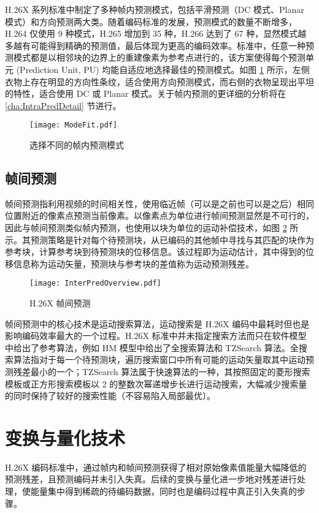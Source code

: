 H.26X 系列标准中制定了多种帧内预测模式，包括平滑预测（DC 模式、Planar 模式）和方向预测两大类。随着编码标准的发展，预测模式的数量不断增多，H.264 仅使用 9 种模式，H.265 增加到 35 种，H.266 达到了 67 种，显然模式越多越有可能得到精确的预测值，最后体现为更高的编码效率。标准中，任意一种预测模式都是以相邻块的边界上的重建像素为参考点进行的，该方案使得每个预测单元 (Prediction Unit, PU) 均能自适应地选择最佳的预测模式。如图 \ref{fig:ModeFit} 所示，左侧衣物上存在明显的方向性条纹，适合使用方向预测模式，而右侧的衣物呈现出平坦的特性，适合使用 DC 或 Planar 模式。关于帧内预测的更详细的分析将在 \ref{cha:IntraPredDetail} 节进行。
\begin{figure}[hbt]
    \centering
    \texttt{[image: ModeFit.pdf]}
    \caption{选择不同的帧内预测模式}
    \label{fig:ModeFit}
\end{figure}

\subsection{帧间预测}
帧间预测指利用视频的时间相关性，使用临近帧（可以是之前也可以是之后）相同位置附近的像素点预测当前像素。以像素点为单位进行帧间预测显然是不可行的，因此与帧间预测类似帧内预测，也使用以块为单位的运动补偿技术，如图 \ref{fig:InterPredOverview} 所示。其预测策略是针对每个待预测块，从已编码的其他帧中寻找与其匹配的块作为参考块，计算参考块到待预测块的位移信息。该过程即为运动估计，其中得到的位移信息称为运动矢量，预测块与参考块的差值称为运动预测残差。
\begin{figure}[hbt]
    \centering
    \texttt{[image: InterPredOverview.pdf]}
    \caption{H.26X 帧间预测}
    \label{fig:InterPredOverview}
\end{figure}

帧间预测中的核心技术是运动搜索算法，运动搜索是 H.26X 编码中最耗时但也是影响编码效率最大的一个过程。H.26X 标准中并未指定搜索方法而只在软件模型中给出了参考算法，例如 HM 模型中给出了全搜索算法和 TZSearch 算法。全搜索算法指对于每一个待预测块，遍历搜索窗口中所有可能的运动矢量取其中运动预测残差最小的一个；TZSearch 算法属于快速算法的一种，其按照固定的菱形搜索模板或正方形搜索模板以 2 的整数次幂递增步长进行运动搜索，大幅减少搜索量的同时保持了较好的搜索性能（不容易陷入局部最优）。

\section{变换与量化技术}
H.26X 编码标准中，通过帧内和帧间预测获得了相对原始像素值能量大幅降低的预测残差，且预测编码并未引入失真。后续的变换与量化进一步地对残差进行处理，使能量集中得到稀疏的待编码数据，同时也是编码过程中真正引入失真的步骤。
